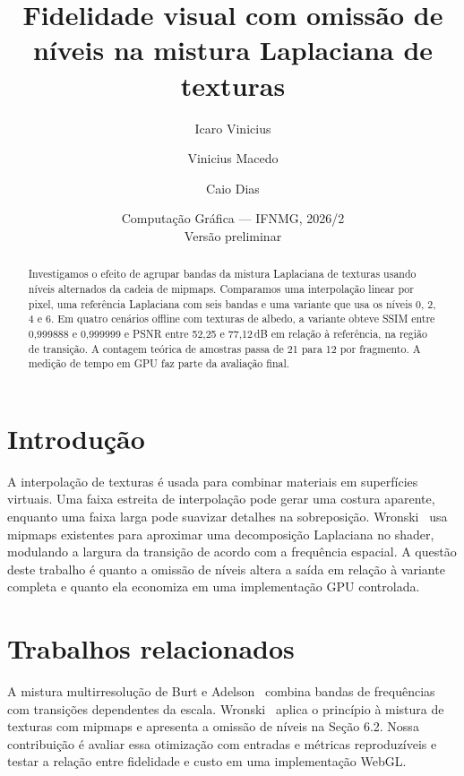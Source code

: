 \documentclass[11pt,a4paper]{article}
\title{Fidelidade visual com omissão de níveis na mistura Laplaciana de texturas}
\author{Icaro Vinicius \and Vinicius Macedo \and Caio Dias}
\date{Computação Gráfica --- IFNMG, 2026/2\\Versão preliminar}
\begin{document}
\maketitle

\begin{abstract}
Investigamos o efeito de agrupar bandas da mistura Laplaciana de texturas usando níveis alternados da cadeia de mipmaps. Comparamos uma interpolação linear por pixel, uma referência Laplaciana com seis bandas e uma variante que usa os níveis 0, 2, 4 e 6. Em quatro cenários offline com texturas de albedo, a variante obteve SSIM entre 0,999888 e 0,999999 e PSNR entre 52,25 e 77,12\,dB em relação à referência, na região de transição. A contagem teórica de amostras passa de 21 para 12 por fragmento. A medição de tempo em GPU faz parte da avaliação final.
\end{abstract}

\section{Introdução}
A interpolação de texturas é usada para combinar materiais em superfícies virtuais. Uma faixa estreita de interpolação pode gerar uma costura aparente, enquanto uma faixa larga pode suavizar detalhes na sobreposição. Wronski~\cite{wronski2025} usa mipmaps existentes para aproximar uma decomposição Laplaciana no shader, modulando a largura da transição de acordo com a frequência espacial. A questão deste trabalho é quanto a omissão de níveis altera a saída em relação à variante completa e quanto ela economiza em uma implementação GPU controlada.

\section{Trabalhos relacionados}
A mistura multirresolução de Burt e Adelson~\cite{burt1983} combina bandas de frequências com transições dependentes da escala. Wronski~\cite{wronski2025} aplica o princípio à mistura de texturas com mipmaps e apresenta a omissão de níveis na Seção 6.2. Nossa contribuição é avaliar essa otimização com entradas e métricas reproduzíveis e testar a relação entre fidelidade e custo em uma implementação WebGL.
\end{document}
